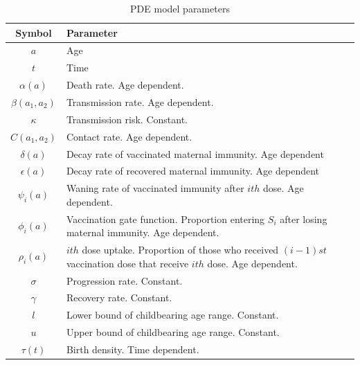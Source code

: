 \documentclass[a4paper,11pt] {scrartcl}
\begin{document}
\begin{table}[h]
\centering
\begin{tabular}{c p{11.5cm}}
\toprule
Symbol & Parameter\\
\midrule
$a$ & Age \\
$t$ & Time \\
$\alpha (a)$ & Death rate. Age dependent.\\
$\beta (a_1,a_2)$ & Transmission rate. Age dependent.\\
$\kappa$ & Transmission risk. Constant.\\
$C (a_1,a_2)$ & Contact rate. Age dependent.\\
$\delta (a)$ & Decay rate of vaccinated maternal immunity. Age dependent\\
$\epsilon (a)$ & Decay rate of recovered maternal immunity. Age dependent\\
$\psi _i (a)$ & Waning rate of vaccinated immunity after $ith$ dose. Age dependent.\\
$\phi_i(a)$ & Vaccination gate function. Proportion entering $S_i$ after losing maternal immunity. Age dependent.\\
$\rho_i(a)$ & $ith$ dose uptake. Proportion of those who received $\left(i-1\right)st$ vaccination dose that receive $ith$ dose. Age dependent.\\
$\sigma$ & Progression rate. Constant.\\
$\gamma$ & Recovery rate. Constant.\\
$l$ & Lower bound of childbearing age range. Constant.\\
$u$ & Upper bound of childbearing age range. Constant.\\
$\tau(t)$ & Birth density. Time dependent.\\
\bottomrule
\end{tabular}
\caption{PDE model parameters}
\label{tab:parameters}
\end{table}
\end{document}
